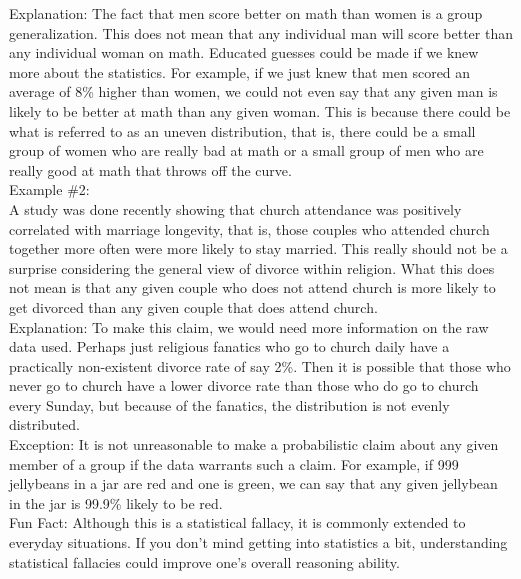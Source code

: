 \documentclass[a4paper,12pt,single,pdftex]{scrartcl}
\begin{document}
    
      Explanation: The fact that men score better on math than women is a group generalization. This does not mean that any individual man will score better than any individual woman on math. Educated guesses could be made if we knew more about the statistics. For example, if we just knew that men scored an average of 8\% higher than women, we could not even say that any given man is likely to be better at math than any given woman. This is because there could be what is referred to as an uneven distribution, that is, there could be a small group of women who are really bad at math or a small group of men who are really good at math that throws off the curve.
    \\

    
      Example \#2:
    \\

    
      A study was done recently showing that church attendance was positively correlated with marriage longevity, that is, those couples who attended church together more often were more likely to stay married. This really should not be a surprise considering the general view of divorce within religion. What this does not mean is that any given couple who does not attend church is more likely to get divorced than any given couple that does attend church.
    \\

    
      Explanation: To make this claim, we would need more information on the raw data used. Perhaps just religious fanatics who go to church daily have a practically non-existent divorce rate of say 2\%. Then it is possible that those who never go to church have a lower divorce rate than those who do go to church every Sunday, but because of the fanatics, the distribution is not evenly distributed.
    \\

    
      Exception: It is not unreasonable to make a probabilistic claim about any given member of a group if the data warrants such a claim. For example, if 999 jellybeans in a jar are red and one is green, we can say that any given jellybean in the jar is  99.9\% likely to be red.
    \\

    
      Fun Fact: Although this is a statistical fallacy, it is commonly extended to everyday situations. If you don't mind getting into statistics a bit, understanding statistical fallacies could improve one's overall reasoning ability.
    \\
\end{document}
